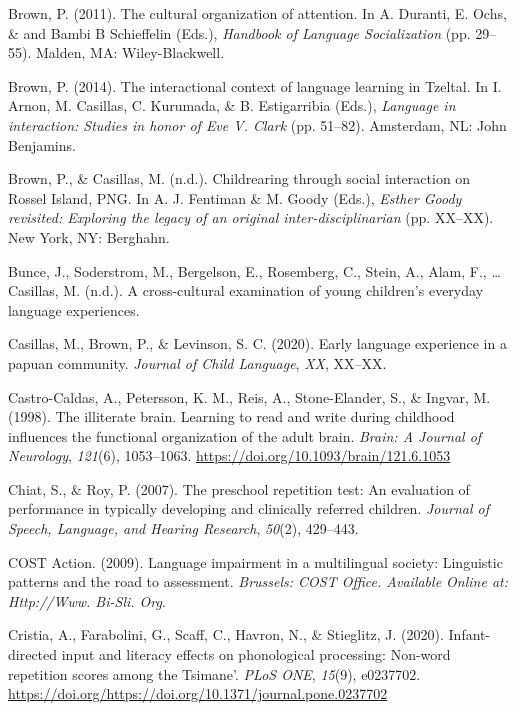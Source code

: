 \documentclass[english,,man,floatsintext]{apa6}
\begin{document}
\leavevmode\hypertarget{ref-brown2011cultural}{}%
Brown, P. (2011). The cultural organization of attention. In A. Duranti, E. Ochs, \& and Bambi B Schieffelin (Eds.), \emph{Handbook of Language Socialization} (pp. 29--55). Malden, MA: Wiley-Blackwell.

\leavevmode\hypertarget{ref-brown2014interactional}{}%
Brown, P. (2014). The interactional context of language learning in Tzeltal. In I. Arnon, M. Casillas, C. Kurumada, \& B. Estigarribia (Eds.), \emph{Language in interaction: Studies in honor of Eve V. Clark} (pp. 51--82). Amsterdam, NL: John Benjamins.

\leavevmode\hypertarget{ref-brownIPchildrearing}{}%
Brown, P., \& Casillas, M. (n.d.). Childrearing through social interaction on Rossel Island, PNG. In A. J. Fentiman \& M. Goody (Eds.), \emph{Esther Goody revisited: Exploring the legacy of an original inter-disciplinarian} (pp. XX--XX). New York, NY: Berghahn.

\leavevmode\hypertarget{ref-bunceURcrosscultural}{}%
Bunce, J., Soderstrom, M., Bergelson, E., Rosemberg, C., Stein, A., Alam, F., \ldots{} Casillas, M. (n.d.). A cross-cultural examination of young children's everyday language experiences.

\leavevmode\hypertarget{ref-casillas2020early}{}%
Casillas, M., Brown, P., \& Levinson, S. C. (2020). Early language experience in a papuan community. \emph{Journal of Child Language}, \emph{XX}, XX--XX.

\leavevmode\hypertarget{ref-castro1998illiterate}{}%
Castro-Caldas, A., Petersson, K. M., Reis, A., Stone-Elander, S., \& Ingvar, M. (1998). The illiterate brain. Learning to read and write during childhood influences the functional organization of the adult brain. \emph{Brain: A Journal of Neurology}, \emph{121}(6), 1053--1063. \url{https://doi.org/10.1093/brain/121.6.1053}

\leavevmode\hypertarget{ref-chiat2007preschool}{}%
Chiat, S., \& Roy, P. (2007). The preschool repetition test: An evaluation of performance in typically developing and clinically referred children. \emph{Journal of Speech, Language, and Hearing Research}, \emph{50}(2), 429--443.

\leavevmode\hypertarget{ref-is08042009language}{}%
COST Action. (2009). Language impairment in a multilingual society: Linguistic patterns and the road to assessment. \emph{Brussels: COST Office. Available Online at: Http://Www. Bi-Sli. Org}.

\leavevmode\hypertarget{ref-cristia2020infant}{}%
Cristia, A., Farabolini, G., Scaff, C., Havron, N., \& Stieglitz, J. (2020). Infant-directed input and literacy effects on phonological processing: Non-word repetition scores among the Tsimane'. \emph{PLoS ONE}, \emph{15}(9), e0237702. \url{https://doi.org/https://doi.org/10.1371/journal.pone.0237702}
\end{document}
